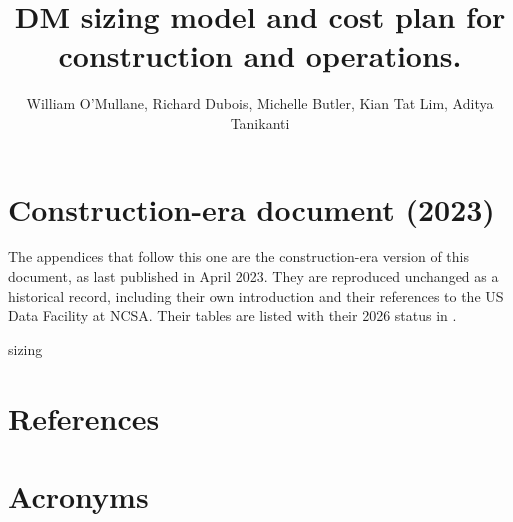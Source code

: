 \documentclass[DM,authoryear,toc]{lsstdoc}
\title{
DM sizing model and cost  plan for construction and operations.}
\author{%
William O'Mullane, Richard Dubois, Michelle Butler, Kian Tat Lim, Aditya Tanikanti
}
\date{\vcsDate}
\begin{document}
\mkshorttitle



\appendix
\section{Construction-era document (2023)}\label{app:construction}

The appendices that follow this one are the construction-era version of this
document, as last published in April 2023. They are reproduced unchanged as a
historical record, including their own introduction and their references to
the US Data Facility at NCSA.
Their tables are listed with their 2026 status in .



 {sizing}

\section{References} \label{sec:bib}


\section{Acronyms} \label{sec:acronyms}

\end{document}
